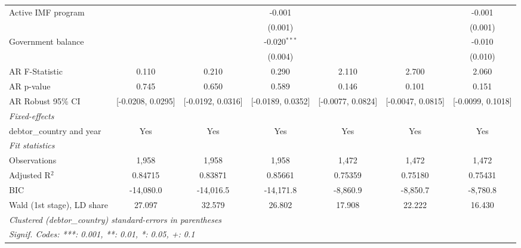 \begin{table}[htbp]
\begin{tabular}{lcccccc}
      Active IMF program         &                   &                   & -0.001            &                   &                   & -0.001\\   
                                 &                   &                   & (0.001)           &                   &                   & (0.001)\\   
      Government balance         &                   &                   & -0.020$^{***}$    &                   &                   & -0.010\\   
                                 &                   &                   & (0.004)           &                   &                   & (0.010)\\   
      AR F-Statistic             & 0.110             & 0.210             & 0.290             & 2.110             & 2.700             & 2.060\\  
      AR p-value                 & 0.745             & 0.650             & 0.589             & 0.146             & 0.101             & 0.151\\  
      AR Robust 95\% CI          & [-0.0208, 0.0295] & [-0.0192, 0.0316] & [-0.0189, 0.0352] & [-0.0077, 0.0824] & [-0.0047, 0.0815] & [-0.0099, 0.1018]\\  
      \midrule
      \emph{Fixed-effects}\\
      debtor\_country and year   & Yes               & Yes               & Yes               & Yes               & Yes               & Yes\\  
      \midrule
      \emph{Fit statistics}\\
      Observations               & 1,958             & 1,958             & 1,958             & 1,472             & 1,472             & 1,472\\  
      Adjusted R$^2$             & 0.84715           & 0.83871           & 0.85661           & 0.75359           & 0.75180           & 0.75431\\  
      BIC                        & -14,080.0         & -14,016.5         & -14,171.8         & -8,860.9          & -8,850.7          & -8,780.8\\  
      Wald (1st stage), LD share & 27.097            & 32.579            & 26.802            & 17.908            & 22.222            & 16.430\\  
      \midrule \midrule
      \multicolumn{7}{l}{\emph{Clustered (debtor\_country) standard-errors in parentheses}}\\
      \multicolumn{7}{l}{\emph{Signif. Codes: ***: 0.001, **: 0.01, *: 0.05, +: 0.1}}\\
   \end{tabular}
\end{table}


